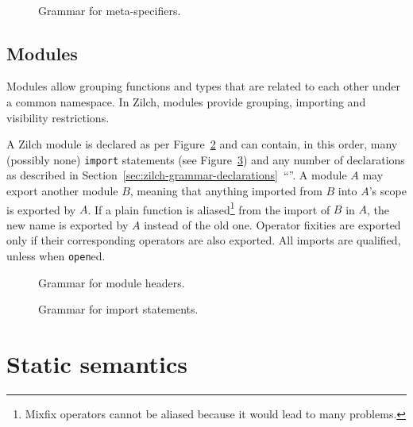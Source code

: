 \begin{figure}[H]
  \centering

  \\

  \caption{Grammar for meta-specifiers.}
  \label{fig:zilch-grammar-declarations-meta-grammar}
\end{figure}

\section{Modules}\label{sec:zilch-grammar-modules}

Modules allow grouping functions and types that are related to each other under a common namespace.
In Zilch, modules provide grouping, importing and visibility restrictions.

A Zilch module is declared as per Figure~\ref{fig:zilch-grammar-modules-headergrammar} and can contain, in this order, many (possibly none) \texttt{import} statements (see Figure~\ref{fig:zilch-grammar-modules-importgrammar}) and any number of declarations as described in Section~\ref{sec:zilch-grammar-declarations}~``''.
A module $A$ may export another module $B$, meaning that anything imported from $B$ into $A$'s scope is exported by $A$.
If a plain function is aliased\footnote{Mixfix operators cannot be aliased because it would lead to many problems.} from the import of $B$ in $A$, the new name is exported by $A$ instead of the old one.
Operator fixities are exported only if their corresponding operators are also exported.
All imports are qualified, unless when \verb|open|ed.

\begin{figure}[H]
  \centering


  \caption{Grammar for module headers.}
  \label{fig:zilch-grammar-modules-headergrammar}
\end{figure}

\begin{figure}[H]
  \centering


  \caption{Grammar for import statements.}
  \label{fig:zilch-grammar-modules-importgrammar}
\end{figure}

\chapter{Static semantics}\label{chap:zilch-staticsem}
